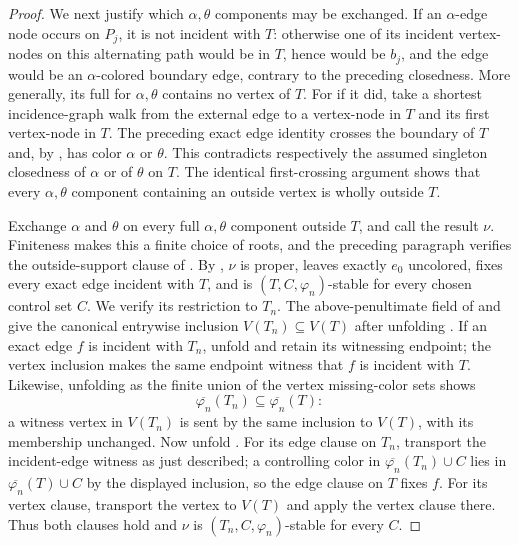 \begin{proof}
We next justify which $\alpha,\theta$ components may be exchanged.  If an
$\alpha$-edge node occurs on $P_j$, it is not incident with $T$:
otherwise one of its incident vertex-nodes on this alternating path
would be in $T$, hence would be $b_j$, and the edge would be an
$\alpha$-colored boundary edge, contrary to the preceding closedness.
More generally, its full  for
$\alpha,\theta$ contains no vertex of $T$.  For if it did, take a
shortest incidence-graph walk from the external edge to a vertex-node in
$T$ and its first vertex-node in $T$.  The preceding exact edge identity
crosses the boundary of $T$ and, by
, has color $\alpha$ or $\theta$.
This contradicts respectively the assumed singleton closedness of
$\alpha$ or of $\theta$ on $T$.  The identical first-crossing argument
shows that every $\alpha,\theta$ component containing an outside vertex
is wholly outside $T$.

Exchange $\alpha$ and $\theta$ on every full $\alpha,\theta$ component
outside $T$, and call the result $\nu$.  Finiteness makes this a finite
choice of roots, and the preceding paragraph verifies the outside-support
clause of .  By
, $\nu$ is proper, leaves exactly
$e_0$ uncolored, fixes every exact edge incident with $T$, and is
$(T,C,\varphi_n)$-stable for every chosen control set $C$.  We verify its
restriction to $T_n$.  The above-penultimate field of
 and
 give the canonical entrywise
inclusion $V(T_n)\subseteq V(T)$ after unfolding
.  If an exact edge $f$ is incident with
$T_n$, unfold  and retain its witnessing
endpoint; the vertex inclusion makes the same endpoint witness that $f$
is incident with $T$.  Likewise, unfolding 
as the finite union of the vertex missing-color sets shows
\[
 \overline{\varphi_n}(T_n)\subseteq
 \overline{\varphi_n}(T):
\]
a witness vertex in $V(T_n)$ is sent by the same inclusion to $V(T)$,
with its  membership unchanged.  Now unfold
.  For its edge clause on $T_n$, transport the
incident-edge witness as just described; a controlling color in
$\overline{\varphi_n}(T_n)\cup C$ lies in
$\overline{\varphi_n}(T)\cup C$ by the displayed inclusion, so the edge
clause on $T$ fixes $f$.  For its vertex clause, transport the vertex to
$V(T)$ and apply the vertex clause there.  Thus both clauses hold and
$\nu$ is $(T_n,C,\varphi_n)$-stable for every $C$.


\end{proof}
